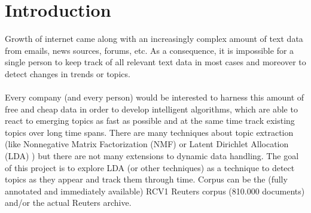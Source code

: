 
\section{Introduction}\label{sec:Introduction}

Growth of internet came along with an increasingly complex amount
of text data from emails, news sources, forums, etc. As a consequence,
it is impossible for a single person to keep track of all relevant text
data in most cases and moreover to detect changes in trends or
topics.
\\
\\
Every company (and every person) would be interested to harness
this amount of free and cheap data in order to develop intelligent
algorithms, which are able to react to emerging topics as fast as
possible and at the same time track existing topics over long time
spans. There are many techniques about topic extraction (like Nonnegative
Matrix Factorization (NMF) or Latent Dirichlet Allocation
(LDA) \cite{Blei:2003:LDA:944919.944937} ) but there are not many extensions to dynamic data
handling.
The goal of this project is to explore LDA (or other techniques) as a
technique to detect topics as they appear and track them through
time. Corpus can be the (fully annotated and immediately available)
RCV1 Reuters corpus (810.000 documents) and/or the actual
Reuters archive.